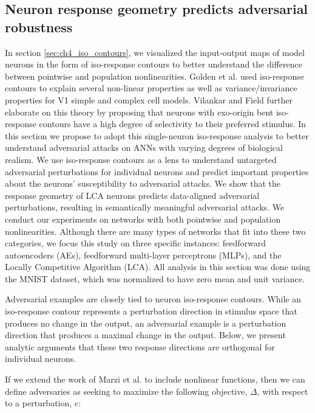 \subsection{Neuron response geometry predicts adversarial robustness}\label{sec:ch4_neuron}
In section \ref{sec:ch4_iso_contours}, we visualized the input-output maps of model neurons in the form of iso-response contours to better understand the difference between pointwise and population nonlinearities. Golden et al. \citeyearpar{golden2016conjectures} used iso-response contours to explain several non-linear properties as well as variance/invariance properties for V1 simple and complex cell models.
Vilankar and Field \citeyearpar{vilankar2017selectivity} further elaborate on this theory by proposing that neurons with exo-origin bent iso-response contours have a high degree of selectivity to their preferred stimulus.
In this section we propose to adopt this single-neuron iso-response analysis to better understand adversarial attacks on ANNs with varying degrees of biological realism.
We use iso-response contours as a lens to understand untargeted adversarial perturbations for individual neurons and predict important properties about the neurons' susceptibility to adversarial attacks.
We show that the response geometry of LCA neurons predicts data-aligned adversarial perturbations, resulting in semantically meaningful adversarial attacks.
We conduct our experiments on networks with both pointwise and population nonlinearities.
Although there are many types of networks that fit into these two categories, we focus this study on three specific instances: feedforward autoencoders (AEs), feedforward multi-layer perceptrons (MLPs), and the Locally Competitive Algorithm (LCA).
All analysis in this section was done using the MNIST dataset, which was normalized to have zero mean and unit variance.

Adversarial examples are closely tied to neuron iso-response contours.
While an iso-response contour represents a perturbation direction in stimulus space that produces no change in the output, an adversarial example is a perturbation direction that produces a maximal change in the output.
Below, we present analytic arguments that these two response directions are orthogonal for individual neurons.

If we extend the work of Marzi et al. \citeyearpar{marzi2018sparsity} to include nonlinear functions, then we can define adversaries as seeking to maximize the following objective, $\Delta$, with respect to a perturbation, $e$:

